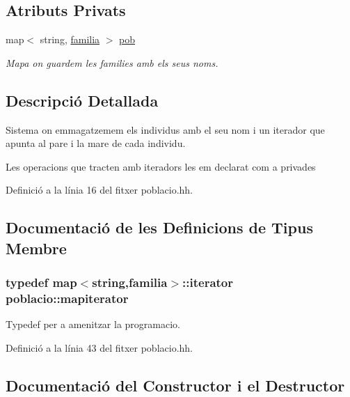 \subsection*{Atributs Privats}
\begin{DoxyCompactItemize}
\item 
map$<$ string, \hyperlink{structpoblacio_1_1familia}{familia} $>$ \hyperlink{classpoblacio_a7ecb70033b151a937143b07d489c4c17}{pob}
\begin{DoxyCompactList}\small\item\em Mapa on guardem les families amb els seus noms. \end{DoxyCompactList}\end{DoxyCompactItemize}


\subsection{Descripció Detallada}
Sistema on emmagatzemem els individus amb el seu nom i un iterador que apunta al pare i la mare de cada individu. 

Les operacions que tracten amb iteradors les em declarat com a privades 

Definició a la línia 16 del fitxer poblacio.\+hh.



\subsection{Documentació de les Definicions de Tipus Membre}
\subsubsection[{\texorpdfstring{mapiterator}{mapiterator}}]{\setlength{\rightskip}{0pt plus 5cm}typedef map$<$string,{\bf familia}$>$\+::iterator {\bf poblacio\+::mapiterator}\hspace{0.3cm}{\ttfamily [private]}}\hypertarget{classpoblacio_a52c3d96b08f7679f27487e7499185ed1}{}\label{classpoblacio_a52c3d96b08f7679f27487e7499185ed1}


Typedef per a amenitzar la programacio. 



Definició a la línia 43 del fitxer poblacio.\+hh.



\subsection{Documentació del Constructor i el Destructor}
